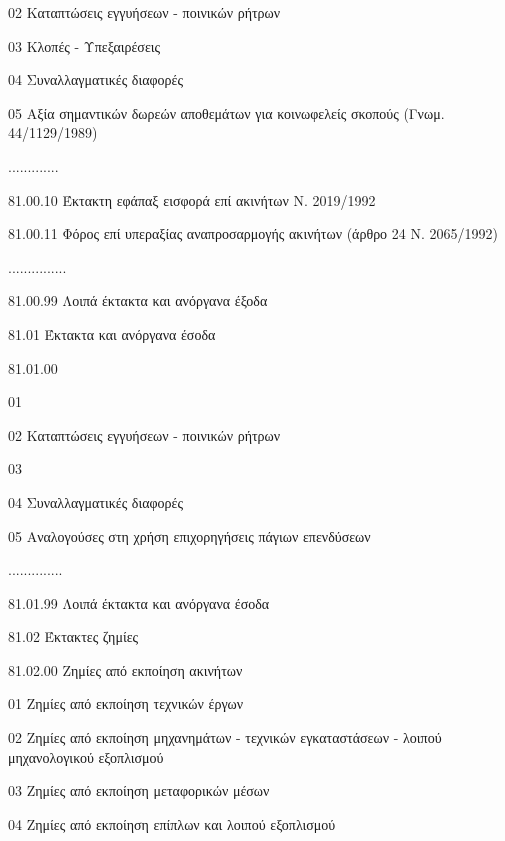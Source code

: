 \documentclass[A4,10pt,greek]{book}
\begin{document}
                               02    Καταπτώσεις εγγυήσεων - ποινικών ρήτρων

                               03    Κλοπές - Υπεξαιρέσεις

                               04    Συναλλαγματικές διαφορές

                               05    Αξία σημαντικών δωρεών αποθεμάτων για κοινωφελείς σκοπούς
                                       (Γνωμ. 44/1129/1989)

                     .............

                     81.00.10    Έκτακτη εφάπαξ εισφορά επί ακινήτων Ν. 2019/1992

                     81.00.11    Φόρος επί υπεραξίας αναπροσαρμογής ακινήτων
                                       (άρθρο 24 Ν. 2065/1992)

                     ...............

                     81.00.99    Λοιπά έκτακτα και ανόργανα έξοδα

        81.01    Έκτακτα και ανόργανα έσοδα

                     81.01.00

                               01

                               02    Καταπτώσεις εγγυήσεων - ποινικών ρήτρων

                               03

                               04    Συναλλαγματικές διαφορές

                               05    Αναλογούσες στη χρήση επιχορηγήσεις πάγιων επενδύσεων

                     ..............

                     81.01.99    Λοιπά έκτακτα και ανόργανα έσοδα

        81.02    Έκτακτες ζημίες

                     81.02.00    Ζημίες από εκποίηση ακινήτων

                               01    Ζημίες από εκποίηση τεχνικών έργων

                               02    Ζημίες από εκποίηση μηχανημάτων - τεχνικών εγκαταστάσεων
                                       - λοιπού μηχανολογικού εξοπλισμού

                               03    Ζημίες από εκποίηση μεταφορικών μέσων

                               04    Ζημίες από εκποίηση επίπλων και λοιπού εξοπλισμού
\end{document}
